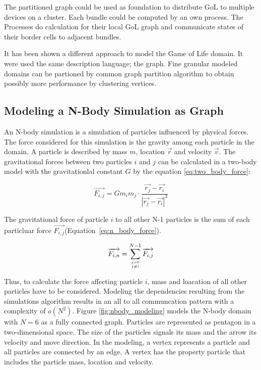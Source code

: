The partitioned graph could be used as foundation to distribute GoL to
multiple devices on a cluster. Each bundle could be computed by an own
process. The Processes do calculation for their local GoL graph and
communicate states of their border cells to adjacent bundles.

It has been shown a different approach to model the Game of Life
domain. It were used the same description language; the graph.
Fine granular modeled domains can be partioned by common graph
partition algorithm to obtain possibly more performance by
clustering vertices.


\subsection{Modeling a N-Body Simulation as Graph}
An N-body simulation is a simulation of particles influenced by
physical forces. The force considered for this simulation is the
gravity among each particle in the domain.  A particle is described by
mass $m$, location $\overrightarrow{r}$ and velocity $\overrightarrow{v}$.  The gravitational forces
between two particles $i$ and $j$ can be calculated in a two-body model 
with the gravitationlal constant $G$ by the equation \ref{eq:two_body_force}:

\begin{equation}
  \label{eq:two_body_force}
  \overrightarrow{F_{i,j}} = G  m_i  m_j \cdot \frac{\overrightarrow{r_j} - \overrightarrow{r_i}}{|\overrightarrow{r_j} - \overrightarrow{r_i}|^3}
\end{equation}

The gravitational force of particle $i$ to all other N-1 particles
is the sum of each particluar force $\overrightarrow{F_{i,j}}$(Equation~\ref{eq:n_body_force}).

\begin{equation}
  \label{eq:n_body_force}
  \overrightarrow{F_{i,n}} = \sum_{j = 0 \atop j \neq i}^{N-1} \overrightarrow{F_{i,j}}
\end{equation}

Thus, to calculate the force affecting particle $i$, mass and
loacation of all other particles have to be considered. Modeling the
dependencies resulting from the simulations algorithm results in an
all to all communcation pattern with a complexity of $o(N^2)$. Figure
\ref{fig:nbody_modeling} models the N-body domain with $N = 6$ as a
fully connected graph. Particles are represented as pentagon in a
two-dimensional space. The size of the particles signals its mass and
the arrow its velocity and move direction.  In the modeling, a vertex
represents a particle and all particles are connected by an edge. A
vertex has the property particle that includes the particle mass,
location and velocity.

